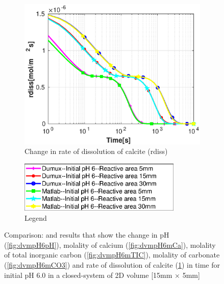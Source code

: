 \begin{figure}[!h]
    \hfill
    \begin{subfigure}{.5\linewidth}
            \centering
        \includegraphics[width=\textwidth]{PICTURES/dvm_pH6_rdiss.eps}
        \caption{Change in rate of dissolution of calcite (rdiss)}
        \label{fig:dvmpH6rdiss}
    \end{subfigure}%
  \hfill
  \hfill
    \begin{subfigure}{.5\linewidth}
            \centering
        \includegraphics[width=0.85\textwidth]{PICTURES/dvm_pH6_legend.eps}
        \caption{Legend}
        \label{fig:dvmpH6legend}
    \end{subfigure}%
    \caption{Comparison: \DuMuX and \MATLAB results that show the change in pH (\cref{fig:dvmpH6pH}), 
    molality of calcium (\cref{fig:dvmpH6mCa}), molality of total inorganic carbon (\cref{fig:dvmpH6mTIC}), 
    molality of carbonate (\cref{fig:dvmpH6mCO3}) and rate of dissolution of calcite (\cref{fig:dvmpH6rdiss}) 
    in time for initial pH 6.0 in a closed-system of 2D volume [15mm $\times$ 5mm]} 
    \label{fig:comparisionDumuxMatlab_pH6.0}
\end{figure}

\endinput